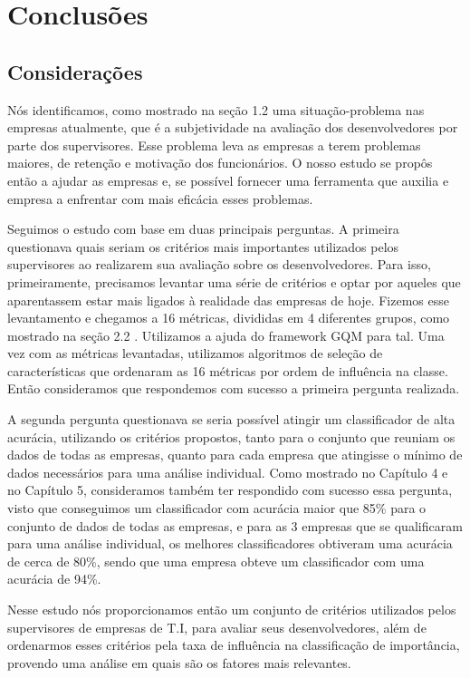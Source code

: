 \chapter[Conclusões]{Conclusões}

\section{Considerações}
Nós identificamos, como mostrado na seção 1.2 uma situação-problema nas empresas atualmente, que é a subjetividade na avaliação dos desenvolvedores por parte dos supervisores. Esse problema leva as empresas a terem problemas maiores, de retenção e motivação dos funcionários. O nosso estudo se propôs então a ajudar as empresas e, se possível fornecer uma ferramenta que auxilia e empresa a enfrentar com mais eficácia esses problemas.

Seguimos o estudo com base em duas principais perguntas. A primeira questionava quais seriam os critérios mais importantes utilizados pelos supervisores ao realizarem sua avaliação sobre os desenvolvedores. Para isso, primeiramente, precisamos levantar uma série de critérios e optar por aqueles que aparentassem estar mais ligados à realidade das empresas de hoje. Fizemos esse levantamento e chegamos a 16 métricas, divididas em 4 diferentes grupos, como mostrado na seção 2.2 . Utilizamos a ajuda do framework GQM para tal. Uma vez com as métricas levantadas, utilizamos algoritmos de seleção de características que ordenaram as 16 métricas por ordem de influência na classe. Então consideramos que respondemos com sucesso a primeira pergunta realizada.

A segunda pergunta questionava se seria possível atingir um classificador de alta acurácia, utilizando os critérios propostos, tanto para o conjunto que reuniam os dados de todas as empresas, quanto para cada empresa que atingisse o mínimo de dados necessários para uma análise individual. Como mostrado no Capítulo 4 e no Capítulo 5, consideramos também ter respondido com sucesso essa pergunta, visto que conseguimos um classificador  com acurácia maior que 85\% para o conjunto de dados de todas as empresas, e para as 3 empresas que se qualificaram para uma análise individual, os melhores classificadores obtiveram uma acurácia de cerca de 80\%, sendo que uma empresa obteve um classificador com uma acurácia de 94\%.

Nesse estudo nós proporcionamos então um conjunto de critérios utilizados pelos supervisores de empresas de T.I, para avaliar seus desenvolvedores, além de ordenarmos esses critérios pela taxa de influência na classificação de importância, provendo uma análise em quais são os fatores mais relevantes.

